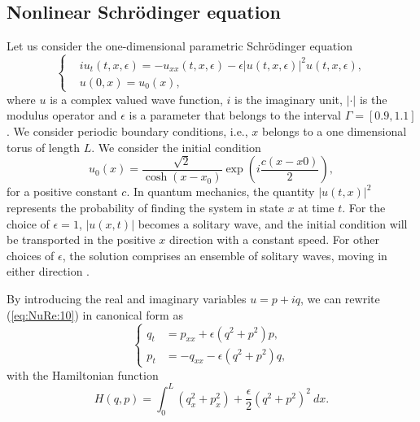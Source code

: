 \subsection{Nonlinear Schr\"odinger equation} \label{chap:NuRe:1.2} Let us consider the one-dimensional parametric Schr\"odinger equation
\begin{equation} \label{eq:NuRe:10}
\left\{
\begin{aligned}
	& i u_t(t,x,\epsilon) = - u_{xx}(t,x,\epsilon) - \epsilon |u(t,x,\epsilon)|^2 u(t,x,\epsilon),\\
	& u(0,x) = u_0(x),
\end{aligned}
\right.
\end{equation}
where $u$ is a complex valued wave function, $i$ is the imaginary unit, $|\cdot|$ is the modulus operator and $\epsilon$ is a parameter that belongs to the interval $\Gamma = [0.9,1.1]$. We consider periodic boundary conditions, i.e., $x$ belongs to a one dimensional torus of length $L$. We consider the initial condition
\begin{equation} \label{eq:NuRe:11}
	u_0(x) = \frac{\sqrt 2}{\cosh(x - x_0)} \exp(i\frac{c(x-x0)}{2}),
\end{equation}
for a positive constant $c$. In quantum mechanics, the quantity $|u(t,x)|^2$ represents the probability of finding the system in state $x$ at time $t$. For the choice of $\epsilon = 1$, $|u(x,t)|$ becomes a solitary wave, and the initial condition will be transported in the positive $x$ direction with a constant speed. For other choices of $\epsilon$, the solution comprises an ensemble of solitary waves, moving in either direction \cite{Faou:2012vh}. 

By introducing the real and imaginary variables $u = p + iq$, we can rewrite (\ref{eq:NuRe:10}) in canonical form as
\begin{equation} \label{eq:NuRe:12}
\left\{
\begin{aligned}
 q_t &= p_{xx} + \epsilon (q^2+p^2)p, \\
 p_t &= -q_{xx} - \epsilon (q^2 + p^2)q,
\end{aligned}
\right.
\end{equation}
with the Hamiltonian function
\begin{equation} \label{eq:NuRe:13}
	H(q,p) = \int_{0}^{L} (q_x^2 + p_x^2) + \frac \epsilon 2 (q^2 + p^2)^2\ dx.
\end{equation}


